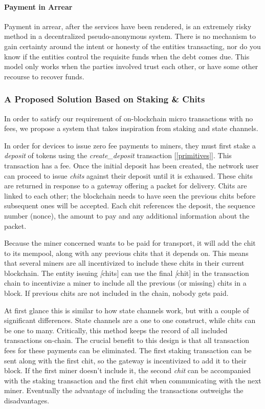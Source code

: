 \documentclass[letterpaper,11pt]{article}
\begin{document}
\paragraph{Payment in Arrear}
Payment in arrear, after the services have been rendered, is an extremely risky method in a decentralized pseudo-anonymous system. There is no mechanism to gain certainty around the intent or honesty of the entities transacting, nor do you know if the entities control the requisite funds when the debt comes due. This model only works when the parties involved trust each other, or have some other recourse to recover funds.

\subsubsection{A Proposed Solution Based on Staking \& Chits}

In order to satisfy our requirement of on-blockchain micro transactions with no fees, we propose a system that takes inspiration from staking and state channels.

In order for devices to issue zero fee payments to miners, they must first stake a \emph{deposit} of tokens using the \emph{create\_deposit} transaction [\ref{primitives}]. This transaction has a fee. Once the initial deposit has been created, the network user can proceed to issue \emph{chits} against their deposit until it is exhaused. These chits are returned in response to a gateway offering a packet for delivery. Chits are linked to each other; the blockchain needs to have seen the previous chits before subsequent ones will be accepted. Each chit references the deposit, the sequence number (nonce), the amount to pay and any additional information about the packet.

Because the miner concerned wants to be paid for transport, it will add the chit to its mempool, along with any previous chits that it depends on. This means that several miners are all incentivized to include these chits in their current blockchain. The entity issuing \emph[chits] can use the final \emph[chit] in the transaction chain to incentivize a miner to include all the previous (or missing) chits in a block. If previous chits are not included in the chain, nobody gets paid.

At first glance this is similar to how state channels work, but with a couple of significant differences. State channels are a one to one construct, while chits can be one to many. Critically, this method keeps the record of all included transactions on-chain. The crucial benefit to this design is that all transaction fees for these payments can be eliminated. The first staking transaction can be sent along with the first chit, so the gateway is incentivized to add it to their block. If the first miner doesn't include it, the second \emph{chit} can be accompanied with the staking transaction and the first chit when communicating with the next miner. Eventually the advantage of including the transactions outweighs the disadvantages.
\end{document}
